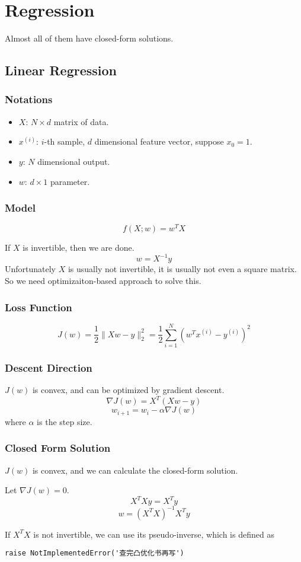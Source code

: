 \chapter{Regression}
Almost all of them have closed-form solutions.
\newpage
\section{Linear Regression}
\subsection{Notations}
\begin{itemize}
    \item $X$: $N \times d$ matrix of data.
    \item $x^{(i)}$: $i$-th sample, $d$ dimensional feature vector, suppose $x_0 = 1$.
    \item $y$: $N$ dimensional output.
    \item  $w$: $d \times 1$ parameter.
\end{itemize}
\subsection{Model}
\[ f(X;w) = w^T X \]
\begin{remark}
    If $X$ is invertible, then we are done.
    \[ w = X^{-1}y \]
    Unfortunately $X$ is usually not invertible, it is usually not even a square matrix. So we need optimizaiton-based approach to solve this.
\end{remark}
\subsection{Loss Function}
\[ J(w)  = \frac{1}{2}\| Xw - y \|_2^2 = \frac{1}{2}\sum_{i=1}^N(w^Tx^{(i)} - y^{(i)})^2 \]
\subsection{Descent Direction}
$J(w)$ is convex, and can be optimized by gradient descent.
\[ \nabla J(w) = X^T(Xw-y) \]
\[ w_{i+1} = w_i - \alpha \nabla J(w) \]
where $\alpha$ is the step size.
\subsection{Closed Form Solution}
$J(w)$ is convex, and we can calculate the closed-form solution.

Let $\nabla J(w) = 0$.
\[ X^TXy = X^Ty \]
\[ w = (X^TX)^{-1}X^Ty \]
\begin{remark}
    If $X^TX$ is not invertible, we can use its pseudo-inverse, which is defined as
\end{remark}
\begin{definition}
    \verb|raise NotImplementedError('查完凸优化书再写')|
\end{definition}